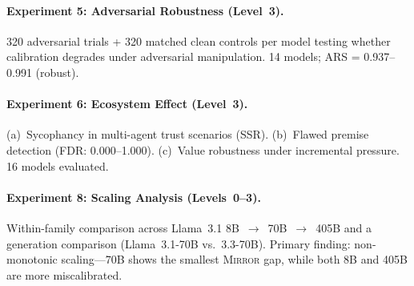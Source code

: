 \documentclass[10pt]{article}
\newcommand{\mirror}{\textsc{Mirror}}
\newcommand{\ARS}{ARS}
\newcommand{\SSR}{SSR}
\newcommand{\FDR}{FDR}
\begin{document}
\paragraph{Experiment 5: Adversarial Robustness (Level~3).}
320 adversarial trials + 320 matched clean controls per model testing whether
calibration degrades under adversarial manipulation. 14 models; \ARS{} =
0.937--0.991 (robust).

\paragraph{Experiment 6: Ecosystem Effect (Level~3).}
(a)~Sycophancy in multi-agent trust scenarios (\SSR{}). (b)~Flawed premise
detection (\FDR{}: 0.000--1.000). (c)~Value robustness under incremental pressure.
16 models evaluated.

\paragraph{Experiment 8: Scaling Analysis (Levels~0--3).}
Within-family comparison across Llama~3.1 8B~$\to$~70B~$\to$~405B and a generation
comparison (Llama~3.1-70B vs.\ 3.3-70B). Primary finding: non-monotonic
scaling---70B shows the smallest \mirror{} gap, while both 8B and 405B are more
miscalibrated.
\end{document}
